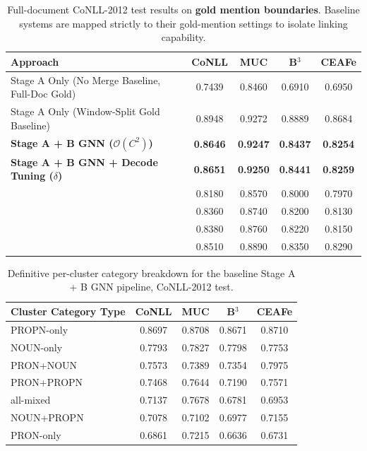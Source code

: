 \documentclass[12pt]{article}
\begin{document}
	\begin{table}[ht]
		\centering
		\small
		\begin{tabular}{lcccc}
			\toprule
			\textbf{Approach} & \textbf{CoNLL} & \textbf{MUC} & \textbf{B$^3$} & \textbf{CEAFe} \\
			\midrule
			Stage A Only (No Merge Baseline, Full-Doc Gold) & 0.7439 & 0.8460 & 0.6910 & 0.6950 \\
			Stage A Only (Window-Split Gold Baseline)        & 0.8948 & 0.9272 & 0.8889 & 0.8684 \\
			\textbf{Stage A + B GNN ($\mathcal{O}(C^2)$)}    & \textbf{0.8646} & \textbf{0.9247} & \textbf{0.8437} & \textbf{0.8254} \\
			\textbf{Stage A + B GNN + Decode Tuning ($\delta$)} & \textbf{0.8651} & \textbf{0.9250} & \textbf{0.8441} & \textbf{0.8259} \\
			\midrule
			\citet{dobrovolskii2021word}        & 0.8180 & 0.8570 & 0.8000 & 0.7970 \\
			\citet{caciularu2023peek}            & 0.8360 & 0.8740 & 0.8200 & 0.8130 \\
			\citet{bohnet2023coreference}       & 0.8380 & 0.8760 & 0.8220 & 0.8150 \\
			\citet{luo2025imcoref}              & 0.8510 & 0.8890 & 0.8350 & 0.8290 \\
			\bottomrule
		\end{tabular}
		\caption{Full-document CoNLL-2012 test results on \textbf{gold mention boundaries}. Baseline systems are mapped strictly to their gold-mention settings to isolate linking capability.}
		\label{tab:stageb}
	\end{table}
	
	\begin{table}[ht]
		\centering
		\small
		\begin{tabular}{lcccc}
			\toprule
			\textbf{Cluster Category Type} & \textbf{CoNLL} & \textbf{MUC} & \textbf{B$^3$} & \textbf{CEAFe} \\
			\midrule
			PROPN-only & 0.8697 & 0.8708 & 0.8671 & 0.8710 \\
			NOUN-only  & 0.7793 & 0.7827 & 0.7798 & 0.7753 \\
			PRON+NOUN  & 0.7573 & 0.7389 & 0.7354 & 0.7975 \\
			PRON+PROPN & 0.7468 & 0.7644 & 0.7190 & 0.7571 \\
			all-mixed  & 0.7137 & 0.7678 & 0.6781 & 0.6953 \\
			NOUN+PROPN & 0.7078 & 0.7102 & 0.6977 & 0.7155 \\
			PRON-only  & 0.6861 & 0.7215 & 0.6636 & 0.6731 \\
			\bottomrule
		\end{tabular}
		\caption{Definitive per-cluster category breakdown for the baseline Stage A + B GNN pipeline, CoNLL-2012 test.}
		\label{tab:stageb_type}
	\end{table}
	
\end{document}
